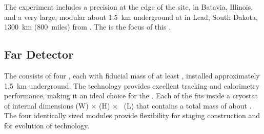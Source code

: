 The  experiment includes a precision  at the edge of the  site, in Batavia, Illinois, and a very large, modular  about \SI{1.5}{km} underground at  in Lead, South Dakota, \SI{1300}{km} (\SI{800}{miles}) from . The   is the focus of this . 


\subsection{Far Detector}
\label{ch:dune-det-tech-ov-fd}

The \fdfiducialmass {}  consists of four  , each with fiducial mass of at least \nominalmodsize, installed approximately \SI{1.5}{km} underground. The  technology provides
excellent tracking and calorimetry performance, making it an ideal
choice for the  . Each of the  fits inside a cryostat of internal dimensions
\cryostatwdth (W) $\times$ \cryostatht (H) $\times$ \cryostatlen~(L) that contains a total  mass of about \larmass{}.
 The four identically sized modules provide flexibility for staging construction and for evolution of  technology.

